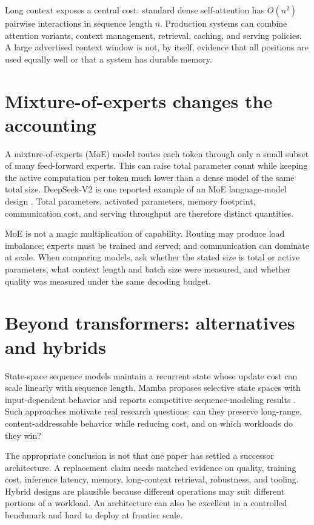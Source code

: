 \documentclass[11pt]{article}
\begin{document}
Long context exposes a central cost: standard dense self-attention has $O(n^2)$ pairwise interactions in sequence length $n$. Production systems can combine attention variants, context management, retrieval, caching, and serving policies. A large advertised context window is not, by itself, evidence that all positions are used equally well or that a system has durable memory.

\section{Mixture-of-experts changes the accounting}
A mixture-of-experts (MoE) model routes each token through only a small subset of many feed-forward experts. This can raise total parameter count while keeping the active computation per token much lower than a dense model of the same total size. DeepSeek-V2 is one reported example of an MoE language-model design \cite{deepseek2024moe}. Total parameters, activated parameters, memory footprint, communication cost, and serving throughput are therefore distinct quantities.

MoE is not a magic multiplication of capability. Routing may produce load imbalance; experts must be trained and served; and communication can dominate at scale. When comparing models, ask whether the stated size is total or active parameters, what context length and batch size were measured, and whether quality was measured under the same decoding budget.

\section{Beyond transformers: alternatives and hybrids}
State-space sequence models maintain a recurrent state whose update cost can scale linearly with sequence length. Mamba proposes selective state spaces with input-dependent behavior and reports competitive sequence-modeling results \cite{gu2023mamba}. Such approaches motivate real research questions: can they preserve long-range, content-addressable behavior while reducing cost, and on which workloads do they win?

The appropriate conclusion is not that one paper has settled a successor architecture. A replacement claim needs matched evidence on quality, training cost, inference latency, memory, long-context retrieval, robustness, and tooling. Hybrid designs are plausible because different operations may suit different portions of a workload. An architecture can also be excellent in a controlled benchmark and hard to deploy at frontier scale.
\end{document}
